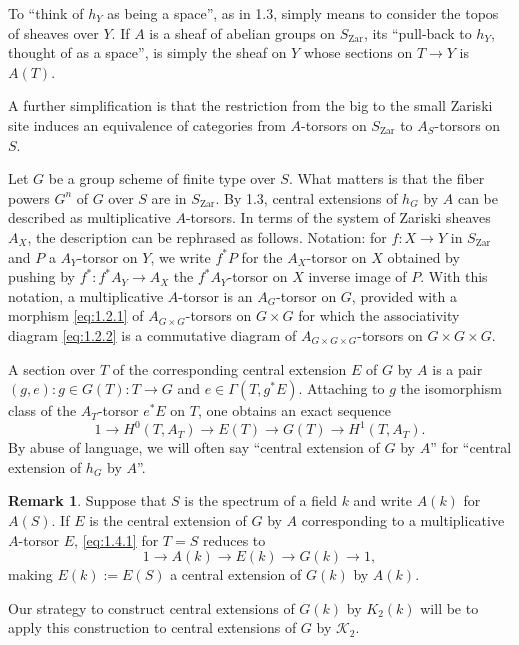 \documentclass[11pt,a4paper]{article}
\theoremstyle{plain}
\theoremstyle{definition}
\newtheorem{remark}[theorem]{Remark}
\newcommand{\cK}{\mathcal{K}}
\newcommand{\Zar}{\mathrm{Zar}}
\begin{document}
To ``think of $h_Y$ as being a space'', as in 1.3, simply means to consider the topos of sheaves over $Y$. If $A$ is a sheaf of abelian groups on $S_{\Zar}$, its ``pull-back to $h_Y$, thought of as a space'', is simply the sheaf on $Y$ whose sections on $T \to Y$ is $A(T)$.

A further simplification is that the restriction from the big to the small Zariski site induces an equivalence of categories from $A$-torsors on $S_{\Zar}$ to $A_S$-torsors on $S$.

Let $G$ be a group scheme of finite type over $S$. What matters is that the fiber powers $G^n$ of $G$ over $S$ are in $S_{\Zar}$. By 1.3, central extensions of $h_G$ by $A$ can be described as multiplicative $A$-torsors. In terms of the system of Zariski sheaves $A_X$, the description can be rephrased as follows. Notation: for $f: X \to Y$ in $S_{\Zar}$ and $P$ a $A_Y$-torsor on $Y$, we write $f^*P$ for the $A_X$-torsor on $X$ obtained by pushing by $f^*: f^*A_Y \to A_X$ the $f^*A_Y$-torsor on $X$ inverse image of $P$. With this notation, a multiplicative $A$-torsor is an $A_G$-torsor on $G$, provided with a morphism \eqref{eq:1.2.1} of $A_{G \times G}$-torsors on $G \times G$ for which the associativity diagram \eqref{eq:1.2.2} is a commutative diagram of $A_{G \times G \times G}$-torsors on $G \times G \times G$.

A section over $T$ of the corresponding central extension $E$ of $G$ by $A$ is a pair $(g,e): g \in G(T): T \to G$ and $e \in \Gamma(T, g^*E)$. Attaching to $g$ the isomorphism class of the $A_T$-torsor $e^*E$ on $T$, one obtains an exact sequence
\begin{equation}\label{eq:1.4.1}
1 \to H^0(T, A_T) \to E(T) \to G(T) \to H^1(T, A_T).
\end{equation}
By abuse of language, we will often say ``central extension of $G$ by $A$'' for ``central extension of $h_G$ by $A$''.

\begin{remark}
Suppose that $S$ is the spectrum of a field $k$ and write $A(k)$ for $A(S)$. If $E$ is the central extension of $G$ by $A$ corresponding to a multiplicative $A$-torsor $E$, \eqref{eq:1.4.1} for $T=S$ reduces to
\[1 \to A(k) \to E(k) \to G(k) \to 1,\]
making $E(k) := E(S)$ a central extension of $G(k)$ by $A(k)$.

Our strategy to construct central extensions of $G(k)$ by $K_2(k)$ will be to apply this construction to central extensions of $G$ by $\cK_2$.
\end{remark}
\end{document}

